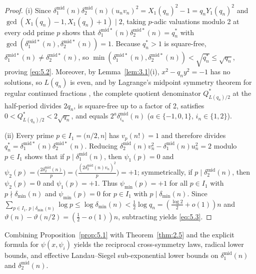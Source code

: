 \documentclass[11pt,reqno]{amsart}
\theoremstyle{remark}
\numberwithin{equation}{section}
\begin{document}
\begin{proof}
(i) Since $\delta_1^{\mathrm{mid}}(n)\delta_2^{\mathrm{mid}}(n)(u_n v_n)^2 = X_1(q_n)^2 - 1 = q_n Y_1(q_n)^2$ and $\gcd(X_1(q_n) - 1, X_1(q_n) + 1) \mid 2$, taking $p$-adic valuations modulo 2 at every odd prime $p$ shows that $\delta_1^{\mathrm{mid}*}(n)\delta_2^{\mathrm{mid}*}(n) = q_n^*$ with $\gcd(\delta_1^{\mathrm{mid}*}(n), \delta_2^{\mathrm{mid}*}(n)) = 1$. Because $q_n^* > 1$ is square-free, $\delta_1^{\mathrm{mid}*}(n) \ne \delta_2^{\mathrm{mid}*}(n)$, so $\min(\delta_1^{\mathrm{mid}*}(n), \delta_2^{\mathrm{mid}*}(n)) < \sqrt{q_n^*} \le \sqrt{q_n}$, proving \eqref{eq:5.2}. Moreover, by Lemma~\ref{lem:3.1}(i), $x^2 - q_n y^2 = -1$ has no solutions, so $L(q_n)$ is even, and by Lagrange's midpoint symmetry theorem for regular continued fractions \cite[\S 25]{Perron1954}, the complete quotient denominator $Q_{L(q_n)/2}^*$ at the half-period divides $2q_n$, is square-free up to a factor of 2, satisfies $0 < Q_{L(q_n)/2}^* < 2\sqrt{q_n}$, and equals $2^a \delta_{i_n}^{\mathrm{mid}}(n)$ ($a \in \{-1, 0, 1\}$, $i_n \in \{1, 2\}$).

(ii) Every prime $p \in I_1 = (n/2, n]$ has $v_p(n!) = 1$ and therefore divides $q_n^* = \delta_1^{\mathrm{mid}*}(n)\delta_2^{\mathrm{mid}*}(n)$. Reducing $\delta_2^{\mathrm{mid}}(n)v_n^2 - \delta_1^{\mathrm{mid}}(n)u_n^2 = 2$ modulo $p \in I_1$ shows that if $p \mid \delta_1^{\mathrm{mid}}(n)$, then $\psi_1(p) = 0$ and $\psi_2(p) = \bigl(\frac{2\delta_2^{\mathrm{mid}}(n)}{p}\bigr) = \bigl(\frac{(2\delta_2^{\mathrm{mid}}(n)v_n)^2}{p}\bigr) = +1$; symmetrically, if $p \mid \delta_2^{\mathrm{mid}}(n)$, then $\psi_2(p) = 0$ and $\psi_1(p) = +1$. Thus $\psi_{\min}(p) = +1$ for all $p \in I_1$ with $p \nmid \delta_{\min}(n)$ and $\psi_{\min}(p) = 0$ for $p \in I_1$ with $p \mid \delta_{\min}(n)$. Since $\sum_{p \in I_1,\, p \mid \delta_{\min}(n)} \log p \le \log \delta_{\min}(n) < \frac{1}{2}\log q_n = (\frac{\log 2}{2} + o(1))n$ and $\vartheta(n) - \vartheta(n/2) = (\frac{1}{2} - o(1))n$, subtracting yields \eqref{eq:5.3}.
\end{proof}

Combining Proposition~\ref{prop:5.1} with Theorem~\ref{thm:2.5} and the explicit formula for $\psi(x, \psi_i)$ yields the reciprocal cross-symmetry laws, radical lower bounds, and effective Landau--Siegel sub-exponential lower bounds on $\delta_1^{\mathrm{mid}}(n)$ and $\delta_2^{\mathrm{mid}}(n)$.
\end{document}
